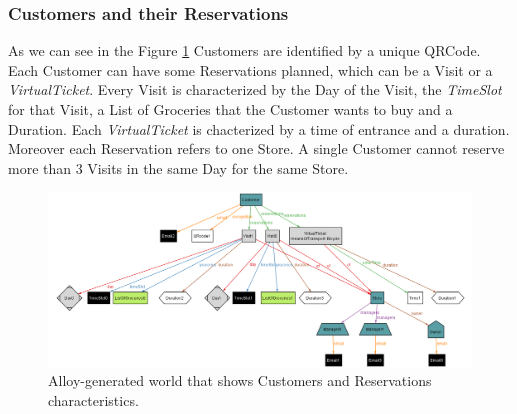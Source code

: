 \documentclass[a4paper, 12pt, oneside]{article}
\begin{document}
\subsubsection{Customers and their Reservations}
As we can see in the Figure \ref{alloy_customer} Customers are identified by a unique QRCode. Each Customer can have some Reservations planned, which can be a Visit or a \textit{VirtualTicket}. Every Visit is characterized by the Day of the Visit, the \textit{TimeSlot} for that Visit, a List of Groceries that the Customer wants to buy and a Duration.  Each \textit{VirtualTicket} is chacterized by a time of entrance and a duration. Moreover each Reservation refers to one Store. A single Customer cannot reserve more than 3 Visits in the same Day for the same Store.
\begin{figure}[h!]
\centering
	\centering
  	\includegraphics[height=0.27\textheight, scale=0.3, keepaspectratio]{img/alloy/alloy_customer_reservations.png}
	\caption{Alloy-generated world that shows Customers and Reservations characteristics.}
 	\label{alloy_customer}
\end{figure}
\end{document}
